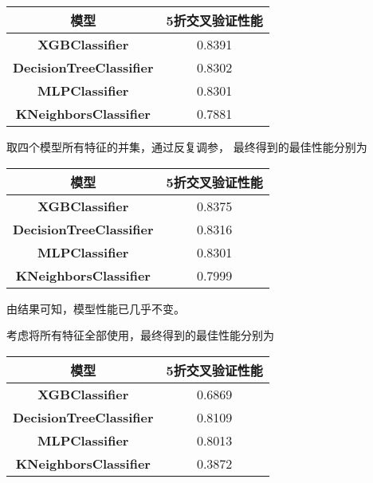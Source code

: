 \documentclass[12pt, a4paper, oneside]{ctexart}
\begin{document}
\begin{table*}[h]
    \centering%
    \begin{tabular}{cc}%
    \toprule%
    模型&5折交叉验证性能 \\
    \midrule%
    \textbf{XGBClassifier} &0.8391\\
    \textbf{DecisionTreeClassifier} &0.8302\\
    \textbf{MLPClassifier} &0.8301\\
    \textbf{KNeighborsClassifier} & 0.7881\\

    \bottomrule%
    \end{tabular}
\end{table*}
\clearpage
取四个模型所有特征的并集，通过反复调参，
最终得到的最佳性能分别为

\begin{table*}[h]
    \centering%
    \begin{tabular}{cc}%
    \toprule%
    模型&5折交叉验证性能 \\
    \midrule%
    \textbf{XGBClassifier} &0.8375\\
    \textbf{DecisionTreeClassifier} &0.8316\\
    \textbf{MLPClassifier} &0.8301\\
    \textbf{KNeighborsClassifier} & 0.7999\\

    \bottomrule%
    \end{tabular}
\end{table*}

由结果可知，模型性能已几乎不变。

考虑将所有特征全部使用，最终得到的最佳性能分别为

\begin{table*}[h]
    \centering%
    \begin{tabular}{cc}%
    \toprule%
    模型&5折交叉验证性能 \\
    \midrule%
    \textbf{XGBClassifier} &0.6869\\
    \textbf{DecisionTreeClassifier} &0.8109\\
    \textbf{MLPClassifier} &0.8013\\
    \textbf{KNeighborsClassifier} & 0.3872\\

    \bottomrule%
    \end{tabular}
\end{table*}
\end{document}
